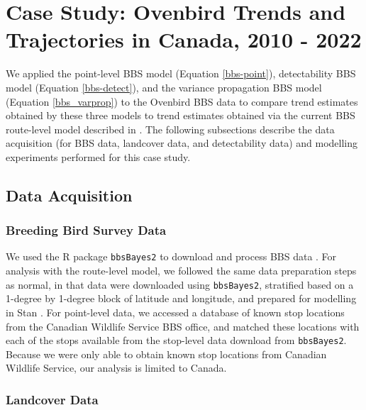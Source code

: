 \section{Case Study: Ovenbird Trends and Trajectories in Canada, 2010 - 2022}

\par We applied the point-level BBS model (Equation \ref{bbs-point}), detectability BBS model (Equation \ref{bbs-detect}), and the variance propagation BBS model (Equation \ref{bbs_varprop}) to the Ovenbird BBS data to compare trend estimates obtained by these three models to trend estimates obtained via the current BBS route-level model described in \citet{smith_spatially_2023}.
The following subsections describe the data acquisition (for BBS data, landcover data, and detectability data) and modelling experiments performed for this case study.

\subsection{Data Acquisition}

\subsubsection{Breeding Bird Survey Data}

\par We used the R package \texttt{bbsBayes2} to download and process BBS data \citep{edwards_bbsbayes_2021}. 
For analysis with the route-level model, we followed the same data preparation steps as normal, in that data were downloaded using \texttt{bbsBayes2}, stratified based on a 1-degree by 1-degree block of latitude and longitude, and prepared for modelling in Stan \citep{stan_development_team_stan_2024}.
For point-level data, we accessed a database of known stop locations from the Canadian Wildlife Service BBS office, and matched these locations with each of the stops available from the stop-level data download from \texttt{bbsBayes2}.
Because we were only able to obtain known stop locations from Canadian Wildlife Service, our analysis is limited to Canada.

\subsubsection{Landcover Data}

